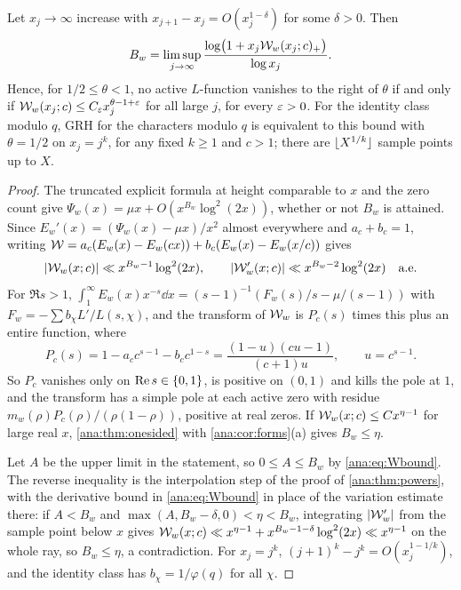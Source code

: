 \begin{theorem}\label{ana:thm:balanced}
Let $x_j\to\infty$ increase with $x_{j+1}-x_j=O(x_j^{1-\delta})$ for some $\delta>0$. Then
\[
 B_w=\limsup_{j\to\infty}\frac{\log\bigl(1+x_j\mathcal{W}_w(x_j;c)_+\bigr)}{\log x_j}.
\]
Hence, for $1/2\le\theta<1$, no active $L$-function vanishes to the right of $\theta$ if and
only if $\mathcal{W}_w(x_j;c)\le C_\varepsilon x_j^{\theta-1+\varepsilon}$ for all large $j$, for every $\varepsilon>0$.
For the identity class modulo $q$, GRH for the characters modulo $q$ is equivalent to this
bound with $\theta=1/2$ on $x_j=j^k$, for any fixed $k\ge1$ and $c>1$; there are
$\lfloor X^{1/k}\rfloor$ sample points up to $X$.
\end{theorem}

\begin{proof}
The truncated explicit formula at height comparable to $x$
\cite{Davenport2000Multiplicative} and the zero count give
$\Psi_w(x)=\mu x+O(x^{B_w}\log^2(2x))$, whether or not $B_w$ is attained. Since
$E_w'(x)=(\Psi_w(x)-\mu x)/x^2$ almost everywhere and $a_c+b_c=1$, writing
$\mathcal{W}=a_c(E_w(x)-E_w(cx))+b_c(E_w(x)-E_w(x/c))$ gives
\begin{equation}\label{ana:eq:Wbound}
 \lvert\mathcal{W}_w(x;c)\rvert\ll x^{B_w-1}\log^2(2x),\qquad
 \lvert\mathcal{W}_w'(x;c)\rvert\ll x^{B_w-2}\log^2(2x)\quad\text{a.e.}
\end{equation}
For $\Re s>1$, $\int_1^\infty E_w(x)x^{-s}\dd x=(s-1)^{-1}(F_w(s)/s-\mu/(s-1))$ with
$F_w=-\sum b_\chi L'/L(s,\chi)$, and the transform of $\mathcal{W}_w$ is
$P_c(s)$ times this plus an entire function, where
\[
 P_c(s)=1-a_cc^{s-1}-b_cc^{1-s}=\frac{(1-u)(cu-1)}{(c+1)u},\qquad u=c^{s-1}.
\]
So $P_c$ vanishes only on $\operatorname{Re} s\in\{0,1\}$, is positive on $(0,1)$ and kills the pole at $1$,
and the transform has a simple pole at each active zero with residue
$m_w(\rho)P_c(\rho)/(\rho(1-\rho))$, positive at real zeros. If $\mathcal{W}_w(x;c)\le Cx^{\eta-1}$ for
large real $x$, \cref{ana:thm:onesided} with \cref{ana:cor:forms}(a) gives $B_w\le\eta$.

Let $A$ be the upper limit in the statement, so $0\le A\le B_w$ by \eqref{ana:eq:Wbound}. The
reverse inequality is the interpolation step of the proof of \cref{ana:thm:powers}, with the
derivative bound in \eqref{ana:eq:Wbound} in place of the variation estimate there: if $A<B_w$
and $\max(A,B_w-\delta,0)<\eta<B_w$, integrating $\lvert\mathcal{W}_w'\rvert$ from the sample point below
$x$ gives $\mathcal{W}_w(x;c)\ll x^{\eta-1}+x^{B_w-1-\delta}\log^2(2x)\ll x^{\eta-1}$ on the whole
ray, so $B_w\le\eta$, a contradiction. For $x_j=j^k$, $(j+1)^k-j^k=O(x_j^{1-1/k})$, and the identity
class has $b_\chi=1/\varphi(q)$ for all $\chi$.
\end{proof}

